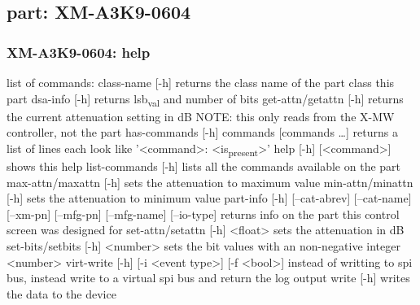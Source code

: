 \documentclass[11pt]{article}
\begin{document}
\subsection{part: XM-A3K9-0604}
\label{sec:org768296a}
\subsubsection{XM-A3K9-0604: help}
\label{sec:org4b3441f}
list of commands:
  class-name [-h]
    returns the class name of the part class this part
  dsa-info [-h]
    returns lsb\textsubscript{val} and number of bits
  get-attn/getattn [-h]
    returns the current attenuation setting in dB
    NOTE: this only reads from the X-MW controller, not the part
  has-commands [-h] commands [commands \ldots{}]
    returns a list of lines each look like '<command>: <is\textsubscript{present}>'
  help [-h] [<command>]
    shows this help
  list-commands [-h]
    lists all the commands available on the part
  max-attn/maxattn [-h]
    sets the attenuation to maximum value
  min-attn/minattn [-h]
    sets the attenuation to minimum value
  part-info  [-h] [--cat-abrev] [--cat-name] [--xm-pn] [--mfg-pn] [--mfg-name]
          [--io-type]
    returns info on the part this control screen was designed for
  set-attn/setattn [-h] <float>
    sets the attenuation in dB
  set-bits/setbits [-h] <number>
    sets the bit values with an non-negative integer <number>
  virt-write [-h] [-i <event type>] [-f <bool>]
    instead of writting to spi bus, instead write to a virtual spi bus
    and return the log output
  write [-h]
    writes the data to the device
\end{document}
